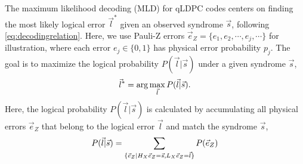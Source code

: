 



The maximum likelihood decoding (MLD) for qLDPC codes centers on finding the most 
likely logical error \( \vec{l}^* \) given an observed syndrome \( \vec{s} \), following \eqref{eq:decodingrelation}.
Here, we use Pauli-Z errors $\vec{e}_Z=\{e_1,e_2,\cdots,e_j,\cdots\}$ for illustration, where each error \( e_j \in \{0,1\} \) has physical error probability \( p_j \). The goal is to maximize the logical probability $P(\vec{l}|\vec{s})$ under a given syndrome $\vec{s}$,
\begin{equation}\small
\vec{l}^* = \arg\max_{\vec{l}} P(\vec{l}|\vec{s}).
\label{eq:logicalsyndrome}
\end{equation}
Here, the logical probability $P(\vec{l}|\vec{s})$ is calculated by accumulating all physical errors $\vec{e}_Z$ that belong to the logical error $\vec{l}$ and match the syndrome $\vec{s}$,
\begin{equation}\small \label{eq:logicalprobcons}
    P(\vec{l}|\vec{s}) = \sum_{\{\vec{e}_Z \mid 
H_X \vec{e}_Z = \vec{s}, L_X\vec{e}_Z  =\vec{l} \}} P(\vec{e}_Z) 
\end{equation}

